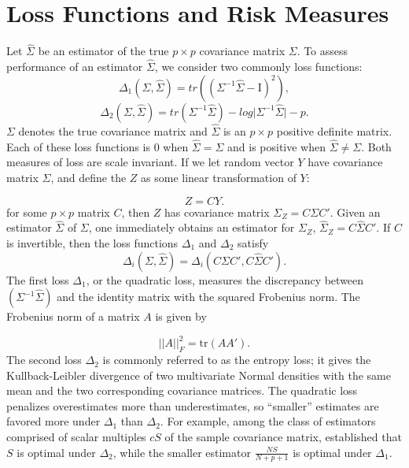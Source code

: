 \section{Loss Functions and Risk Measures}
Let $\hat{\Sigma}$ be an estimator of the true $p \times p$ covariance matrix $\Sigma$. To assess performance of an estimator $\hat{\Sigma}$, we consider two commonly loss functions:
\begin{equation} \label{eq:quad-loss}
\Delta_1\left(\Sigma,\hat{\Sigma} \right) = tr\left(\left( \Sigma^{-1} \hat{\Sigma} - \mathrm{I}\right)^2 \right),
\end{equation}
\noindent
\begin{equation} \label{eq:entropy-loss}
\Delta_2\left(\Sigma,\hat{\Sigma}\right) = tr\left( \Sigma^{-1} \hat{\Sigma} \right) - log \vert \Sigma^{-1} \hat{\Sigma} \vert - p.
\end{equation}
\noindent
$\Sigma$ denotes the true covariance matrix and $\hat{\Sigma}$ is an $p \times p$ positive definite matrix. Each of these loss functions is $0$ when $\hat{\Sigma} = \Sigma$ and is positive when $\hat{\Sigma} \ne \Sigma$. Both measures of loss are scale invariant. If we let random vector $Y$ have covariance matrix $\Sigma$, and define the $Z$ as some linear transformation of $Y$:

\[
Z = CY. 
\]
\noindent
for some $p \times p$ matrix $C$,  then $Z$ has covariance matrix $\Sigma_Z = C \Sigma C'$. Given an estimator $\hat{\Sigma}$ of $\Sigma$, one immediately obtains an estimator for $\Sigma_Z$, $\hat{\Sigma}_Z = C \hat{\Sigma} C'$. If $C$ is invertible, then the loss functions $\Delta_1$ and $\Delta_2$ satisfy
\[
\Delta_i\left(\Sigma,\hat{\Sigma}\right) = \Delta_i\left(C \Sigma C', C \hat{\Sigma}C' \right). 
\]
\noindent
The first loss $\Delta_1$, or the quadratic loss, measures the discrepancy between $\left(\Sigma^{-1} \hat{\Sigma}\right)$ and the identity matrix with the squared Frobenius norm. The Frobenius norm of a matrix $A$ is given by 

\[
\vert \vert A \vert \vert_F^2 = \mbox{tr}\left(A A'\right).
\]
\noindent
The second loss $\Delta_2$ is commonly referred to as the entropy loss; it gives the Kullback-Leibler divergence of two multivariate Normal densities with the same mean and the two corresponding covariance matrices. The quadratic loss penalizes overestimates more than underestimates, so ``smaller'' estimates are favored more under $\Delta_1$ than $\Delta_2$. For example, among the class of estimators comprised of scalar multiples $cS$ of the sample covariance matrix, \cite{haff1980empirical} established that $S$ is optimal under $\Delta_2$, while the smaller estimator $\frac{NS}{N+p+1}$ is optimal under $\Delta_1$. 

